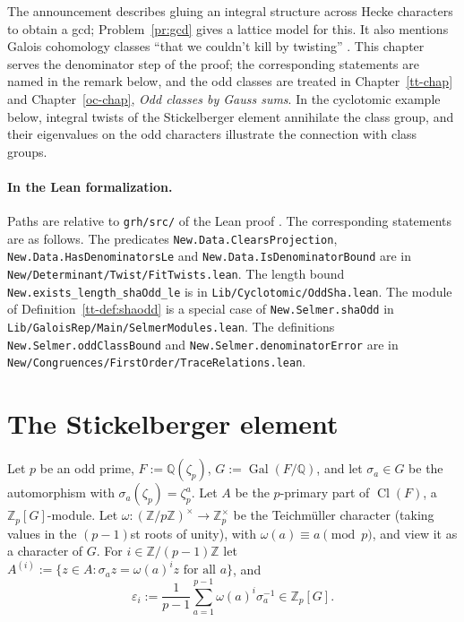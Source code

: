 \documentclass[reqno]{amsart}
\newcounter{chap}
\theoremstyle{definition}
\theoremstyle{plain}
\newcommand{\Z}{\mathbb{Z}}
\newcommand{\Q}{\mathbb{Q}}
\newcommand{\Cl}{\operatorname{Cl}}
\newcommand{\Gal}{\operatorname{Gal}}
\begin{document}
The announcement \cite[item~15]{Alp} describes gluing an integral structure across Hecke characters to obtain a gcd; Problem~\ref{pr:gcd} gives a lattice model for this.  It also mentions Galois cohomology classes ``that we couldn't kill by twisting'' \cite[item~17]{Alp}.  This chapter serves the denominator step of the proof; the corresponding statements are named in the remark below, and the odd classes are treated in Chapter~\ref{tt-chap} and Chapter~\ref{oc-chap}, \emph{Odd classes by Gauss sums}.  In the cyclotomic example below, integral twists of the Stickelberger element annihilate the class group, and their eigenvalues on the odd characters illustrate the connection with class groups.

\paragraph{In the Lean formalization.}
Paths are relative to \texttt{grh/src/} of the Lean proof \cite{GL}.  The corresponding statements are as follows.  The predicates \texttt{New.Data.ClearsProjection}, \texttt{New.Data.HasDenominatorsLe} and \texttt{New.Data.IsDenominatorBound} are in \texttt{New/Determinant/Twist/FitTwists.lean}.  The length bound \texttt{New.exists\_length\_shaOdd\_le} is in \texttt{Lib/Cyclotomic/OddSha.lean}.  The module of Definition~\ref{tt-def:shaodd} is a special case of \texttt{New.Selmer.shaOdd} in \texttt{Lib/GaloisRep/Main/SelmerModules.lean}.  The definitions \texttt{New.Selmer.oddClassBound} and \texttt{New.Selmer.denominatorError} are in \texttt{New/Congruences/FirstOrder/TraceRelations.lean}.

\section{The Stickelberger element}\label{sec:stickelberger}

Let \(p\) be an odd prime, \(F := \Q(\zeta_p)\), \(G := \Gal(F/\Q)\), and let \(\sigma_a \in G\) be the automorphism with \(\sigma_a(\zeta_p) = \zeta_p^a\).  Let \(A\) be the \(p\)-primary part of \(\Cl(F)\), a \(\Z_p[G]\)-module.  Let \(\omega \colon (\Z/p\Z)^\times \to \Z_p^\times\) be the Teichmüller character (taking values in the \((p-1)\)st roots of unity), with \(\omega(a) \equiv a \pmod p\), and view it as a character of \(G\).  For \(i \in \Z/(p-1)\Z\) let \(A^{(i)} := \{ z \in A : \sigma_a z = \omega(a)^i z \text{ for all } a \}\), and
\[
  \varepsilon_i := \frac{1}{p-1} \sum_{a=1}^{p-1} \omega(a)^i \sigma_a^{-1} \in \Z_p[G] .
\]
\end{document}
